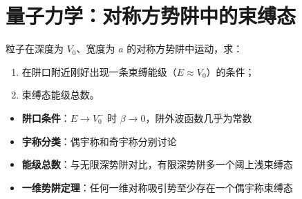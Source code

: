 \section{量子力学：对称方势阱中的束缚态}
\label{sec:finite-square-well-bound}

\begin{modelbox}[题目：对称方势阱中的束缚态]
粒子在深度为 $V_0$、宽度为 $a$ 的对称方势阱中运动，求：
\begin{enumerate}
    \item 在阱口附近刚好出现一条束缚能级（$E\approx V_0$）的条件；
    \item 束缚态能级总数。
\end{enumerate}
\end{modelbox}

\begin{tipbox}[考点快速分析]
\begin{itemize}
    \item \textbf{阱口条件}：$E\to V_0^-$ 时 $\beta\to0$，阱外波函数几乎为常数
    \item \textbf{宇称分类}：偶宇称和奇宇称分别讨论
    \item \textbf{能级总数}：与无限深势阱对比，有限深势阱多一个阈上浅束缚态
    \item \textbf{一维势阱定理}：任何一维对称吸引势至少存在一个偶宇称束缚态
\end{itemize}
\end{tipbox}

